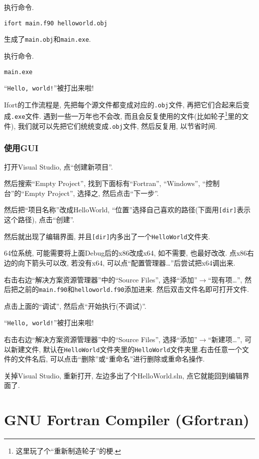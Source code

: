 执行命令.
\begin{verbatim}
ifort main.f90 helloworld.obj
\end{verbatim}
生成了\verb|main.obj|和\verb|main.exe|.

执行命令.
\begin{verbatim}
main.exe
\end{verbatim}
``\verb|Hello, world!|''被打出来啦!

Ifort的工作流程是, 先把每个源文件都变成对应的\verb|.obj|文件, 再把它们合起来后变成\verb|.exe|文件. 遇到一些一万年也不会改, 而且会反复使用的文件(比如轮子\footnote{
    这里玩了个``重新制造轮子''的梗.
}里的文件), 我们就可以先把它们统统变成\verb|.obj|文件, 然后反复用, 以节省时间.

\subsubsection{使用GUI}

打开Visual Studio, 点``创建新项目''.

然后搜索``Empty Project'', 找到下面标有``Fortran'', ``Windows'', ``控制台''的``Empty Project'', 选择之, 然后点击``下一步''.

然后把``项目名称''改成HelloWorld, ``位置''选择自己喜欢的路径(下面用\verb|[dir]|表示这个路径), 点击``创建''.

然后就出现了编辑界面, 并且\verb|[dir]|内多出了一个\verb|HelloWorld|文件夹.

64位系统, 可能需要将上面Debug后的x86改成x64, 如不需要, 也最好改改. 点x86右边的向下箭头可以改, 若没有x64, 可以点``配置管理器\dots''后尝试把x64调出来.

右击右边``解决方案资源管理器''中的``Source Files'', 选择``添加''$\rightarrow$``现有项\dots'', 然后把之前的\verb|main.f90|和\verb|helloworld.f90|添加进来. 然后双击文件名即可打开文件.

点击上面的``调试'', 然后点``开始执行(不调试)''.

``\verb|Hello, world!|''被打出来啦!

右击右边``解决方案资源管理器''中的``Source Files'', 选择``添加''$\rightarrow$``新建项\dots'', 可以新建文件, 默认在\verb|HelloWorld|文件夹里的\verb|HelloWorld|文件夹里.右击任意一个文件的文件名后, 可以点击``删除''或``重命名''进行删除或重命名操作.

关掉Visual Studio, 重新打开, 左边多出了个HelloWorld.sln, 点它就能回到编辑界面了.

\section[GNU Fortran Compiler]{GNU Fortran Compiler (Gfortran)}

